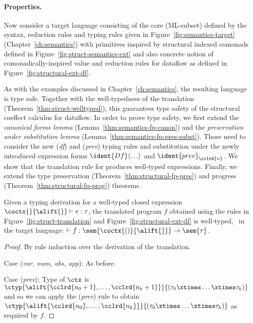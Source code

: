 \paragraph{Properties.}

Now consider a target language consisting of the core (ML-subset) defined by the syntax,
reduction rules and typing rules given in Figure~\ref{fig:semantics-target} (Chapter~\ref{ch:semantics})
with primitives inspired by structural indexed comonads defined in Figure~\ref{fig:struct-semantics-ext}
and also concrete notion of comonadically-inspired value and reduction rules for dataflow as
defined in Figure~\ref{fig:structural-ext-df}.

As with the examples discussed in Chapter~\ref{ch:semantics}, the resulting language is type safe.
Together with the well-typedness of the translation (Theorem~\ref{thm:struct-welltyped}), this
guarantees type safety of the structural coeffect calculus for dataflow.
In order to prove type safety, we first extend the \emph{canonical forms lemma}
(Lemma~\ref{thm:semantics-fp-canon}) and the \emph{preservation under substitution lemma}
(Lemma~\ref{thm:semantics-fp-pres-subst}). Those need to consider the new (\emph{df})
and (\emph{prev}) typing rules and substitution under the newly introduced expression forms
$\ident{Df}\langle\ldots\rangle$ and $\ident{prev}_{\cclrd{n}}$. We show that the translation
rule for  produces well-typed expressions. Finally, we extend the type preservation
(Theorem~\ref{thm:structural-fp-pres}) and progress (Theorem~\ref{thm:structural-fp-prog}) theorems.

\begin{theorem}
\label{thm:structural-df-welltyped}
Given a typing derivation for a well-typed closed expression $\coctx{}{\alift{}} \vdash e : \tau$,
the translated program $f$ obtained using the rules in Figure~\ref{fig:struct-translation}
and Figure~\ref{fig:structural-ext-df} is well-typed, \ie~in the target language: $\vdash f : \sem{\coctx{()}{\alift{}}} \rightarrow \sem{\tau}$.
\end{theorem}
\begin{proof}
By rule induction over the derivation of the translation.

\vspace{0.5em}\noindent\hangindent=0.6cm
Case (\emph{var, num, abs, app}): As before.

\vspace{0.5em}\noindent\hangindent=0.6cm
Case (\emph{prev}): Type of $\ctx$ is $\ctyp{\alift{\cclrd{n_0+1},\ldots,\cclrd{n_k+1}}}{(\tau_0\xtimes\ldots\xtimes\tau_k)}$
  and so we can apply the (\emph{prev}) rule to obtain $\ctyp{\alift{\cclrd{n_0},\ldots,\cclrd{n_k}}}{(\tau_0\xtimes\ldots\xtimes\tau_k)}$
  as required by $f$.
\end{proof}


